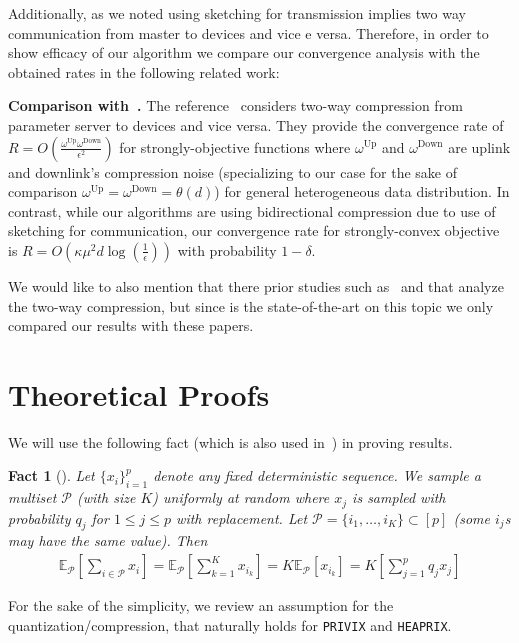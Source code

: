 \documentclass{article} %
\newtheorem{fact}[theorem]{Fact}
\begin{document}
Additionally, as we noted using sketching for transmission implies two way communication from master to devices and vice e versa. Therefore, in order to show efficacy of our algorithm we compare our convergence analysis with the obtained rates in the following related work:

\textbf{Comparison with~\cite{philippenko2020artemis}.} 
The reference~\citep{philippenko2020artemis} considers two-way compression from parameter server to devices and vice versa. They provide the convergence rate of $R=O\left(\frac{\omega^{\text{Up}}\omega^{\text{Down}}}{\epsilon^2}\right)$ for strongly-objective functions where $\omega^{\text{Up}}$ and $\omega^{\text{Down}}$ are uplink and downlink's compression noise (specializing to our case for the sake of comparison $\omega^{\text{Up}}=\omega^{\text{Down}}=\theta\left(d\right)$) for general heterogeneous data distribution. In contrast, while our algorithms are using bidirectional compression due to use of sketching for communication, our convergence rate for strongly-convex objective is $R=O(\kappa\mu^2d\log\left(\frac{1}{\epsilon}\right))$ with probability $1-\delta$.  

We would like to also mention that there prior studies such as~ \cite{tang2019doublesqueeze} and \cite{zheng2019communication} that analyze the two-way compression, but since \cite{philippenko2020artemis} is the state-of-the-art on this topic we only compared our results with these papers.


\clearpage

\section{Theoretical Proofs}\label{app:proofs}



We will use the following fact (which is also used in~\cite{li2019convergence,haddadpour2019convergence}) in proving results.
\begin{fact}[\cite{li2019convergence,haddadpour2019convergence}]\label{fact:1}
Let
$\{x_i\}_{i=1}^p$ denote any fixed deterministic sequence. We sample a multiset $\mathcal{P}$ (with size $K$) uniformly at random where $x_j$ is sampled  with probability $q_j$ for $1\leq j\leq p$ with replacement.  Let $\mathcal{P} = \{i_1,\ldots, i_K\} \subset[p]$ (some $i_j$s may have the same value). Then
\begin{align}
    \mathbb{E}_{\mathcal{P}}\left[\sum_{i\in \mathcal{P}}x_i\right]=\mathbb{E}_{\mathcal{P}}\left[\sum_{k=1}^Kx_{i_k}\right]=K\mathbb{E}_{\mathcal{P}}\left[x_{i_k}\right]=K\left[\sum_{j=1}^pq_jx_j\right]
\end{align}
\end{fact}
For the sake of the simplicity, we review an assumption for the quantization/compression, that naturally holds for \texttt{PRIVIX} and \texttt{HEAPRIX}.
\end{document}
